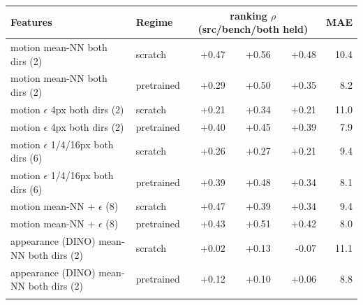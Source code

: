 \begin{tabular}{l l rrr r}
\toprule
Features & Regime & \multicolumn{3}{c}{ranking $\rho$ (src/bench/both held)} & MAE \\
\midrule
motion mean-NN both dirs (2) & scratch & +0.47 & +0.56 & +0.48 & 10.4 \\
motion mean-NN both dirs (2) & pretrained & +0.29 & +0.50 & +0.35 & 8.2 \\
\addlinespace
motion $\epsilon$ 4px both dirs (2) & scratch & +0.21 & +0.34 & +0.21 & 11.0 \\
motion $\epsilon$ 4px both dirs (2) & pretrained & +0.40 & +0.45 & +0.39 & 7.9 \\
\addlinespace
motion $\epsilon$ 1/4/16px both dirs (6) & scratch & +0.26 & +0.27 & +0.21 & 9.4 \\
motion $\epsilon$ 1/4/16px both dirs (6) & pretrained & +0.39 & +0.48 & +0.34 & 8.1 \\
\addlinespace
motion mean-NN + $\epsilon$ (8) & scratch & +0.47 & +0.39 & +0.34 & 9.4 \\
motion mean-NN + $\epsilon$ (8) & pretrained & +0.43 & +0.51 & +0.42 & 8.0 \\
\addlinespace
appearance (DINO) mean-NN both dirs (2) & scratch & +0.02 & +0.13 & -0.07 & 11.1 \\
appearance (DINO) mean-NN both dirs (2) & pretrained & +0.12 & +0.10 & +0.06 & 8.8 \\
\addlinespace
\bottomrule
\end{tabular}
